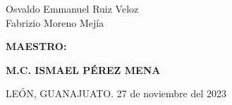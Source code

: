 \begin{titlepage}
\begin{minipage}{180mm}
{{{				Osvaldo Emmanuel Ruiz Veloz\\
				Fabrizio Moreno Mejía
			}}\par
		}
		\vspace{10mm}
		{\fontsize{14}{18pt}\selectfont{}
			\textbf{
				MAESTRO:
			}\par
		}
		\vspace{5mm}
		{\fontsize{12}{16pt}\selectfont{}
			\textbf{
				M.C. ISMAEL PÉREZ MENA
			}\par
		}
		\vspace{12mm}
		{\fontsize{10}{14pt}\selectfont{}
			LEÓN, GUANAJUATO. \hspace{70mm} 27 de noviembre del 2023\par
		}
	\end{minipage}
\end{titlepage}
\restoregeometry